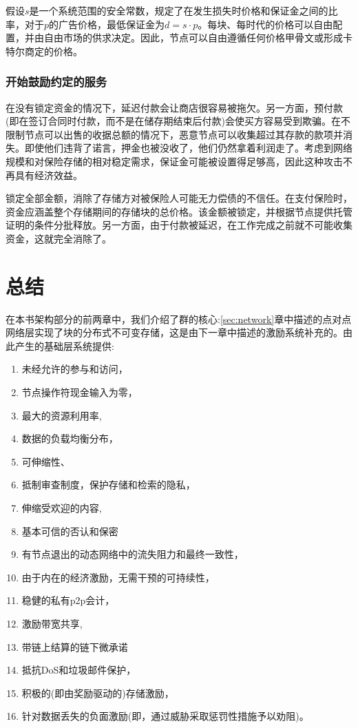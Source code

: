 假设$s$是一个系统范围的安全常数，规定了在发生损失时价格和保证金之间的比率，对于$p$的广告价格，最低保证金为$d=s\cdot p$。每块、每时代的价格可以自由配置，并由自由市场的供求决定。因此，节点可以自由遵循任何价格甲骨文或形成卡特尔商定的价格。

\subsubsection{开始鼓励约定的服务}

在没有锁定资金的情况下，延迟付款会让商店很容易被拖欠。另一方面，预付款(即在签订合同时付款，而不是在储存期结束后付款)会使买方容易受到欺骗。在不限制节点可以出售的收据总额的情况下，恶意节点可以收集超过其存款的款项并消失。即使他们违背了诺言，押金也被没收了，他们仍然拿着利润走了。考虑到网络规模和对保险存储的相对稳定需求，保证金可能被设置得足够高，因此这种攻击不再具有经济效益。

锁定全部金额，消除了存储方对被保险人可能无力偿债的不信任。在支付保险时，资金应涵盖整个存储期间的存储块的总价格。该金额被锁定，并根据节点提供托管证明的条件分批释放。另一方面，由于付款被延迟，在工作完成之前就不可能收集资金，这就完全消除了。

\section{总结}


在本书架构部分的前两章中，我们介绍了群的核心:\ref{sec:network}章中描述的点对点网络层实现了块的分布式不可变存储，这是由下一章中描述的激励系统补充的。由此产生的基础层系统提供:

\begin{enumerate}
    \item 未经允许的参与和访问，
    \item 节点操作符现金输入为零，
    \item 最大的资源利用率, 
    \item 数据的负载均衡分布，
    \item 可伸缩性、 
    \item 抵制审查制度，保护存储和检索的隐私，
    \item 伸缩受欢迎的内容,
    \item 基本可信的否认和保密
    \item 有节点退出的动态网络中的流失阻力和最终一致性，
    \item 由于内在的经济激励，无需干预的可持续性，
    \item 稳健的私有p2p会计， 
    \item 激励带宽共享,
    \item 带链上结算的链下微承诺
    \item 抵抗DoS和垃圾邮件保护，
    \item 积极的(即由奖励驱动的)存储激励，
    \item 针对数据丢失的负面激励(即，通过威胁采取惩罚性措施予以劝阻)。
\end{enumerate}


